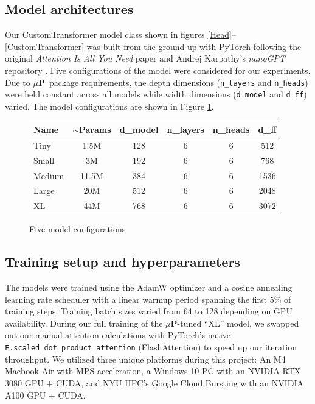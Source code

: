 \documentclass[11pt]{article}
\newcommand{\mup}{$\mu$\textbf{P}}
\begin{document}
\subsection{Model architectures}

Our CustomTransformer model class shown in figures \ref{Head}--\ref{CustomTransformer} was built from the ground up with PyTorch
following the original \textit{Attention Is All You Need} paper and Andrej Karpathy's \textit{nanoGPT} repository \cite{Vaswani,nanoGPT}.
Five configurations of the model were considered for our experiments. Due to \mup~package requirements,
the depth dimensions (\verb|n_layers| and \verb|n_heads|) were held constant across all models while width dimensions
(\verb|d_model| and \verb|d_ff|) varied. The model configurations are shown in Figure \ref{model_configs}.

\begin{figure}[htbp]
	\centering
	\begin{tabular}{lccccc}
		\textbf{Name} & \textbf{$\sim$Params} & \textbf{d\_model} & \textbf{n\_layers} & \textbf{n\_heads} & \textbf{d\_ff} \\
		\hline
		Tiny          & 1.5M                  & 128               & 6                  & 6                 & 512            \\
		Small         & 3M                    & 192               & 6                  & 6                 & 768            \\
		Medium        & 11.5M                 & 384               & 6                  & 6                 & 1536           \\
		Large         & 20M                   & 512               & 6                  & 6                 & 2048           \\
		XL            & 44M                   & 768               & 6                  & 6                 & 3072           \\
		\hline
	\end{tabular}
	\caption{Five model configurations}
	\label{model_configs}
\end{figure}

\subsection{Training setup and hyperparameters}

The models were trained using the AdamW optimizer and a cosine annealing learning rate scheduler with a linear warmup period
spanning the first 5\% of training steps. Training batch sizes varied from 64 to 128 depending on GPU availability.
During our full training of the \mup-tuned ``XL'' model, we swapped out our manual attention calculations
with PyTorch's native \verb|F.scaled_dot_product_attention| (FlashAttention) to speed up our iteration throughput.
We utilized three unique platforms during this project: An M4 Macbook Air with MPS acceleration, a Windows 10 PC with an NVIDIA RTX 3080 GPU + CUDA,
and NYU HPC's Google Cloud Bursting with an NVIDIA A100 GPU + CUDA.
\end{document}

